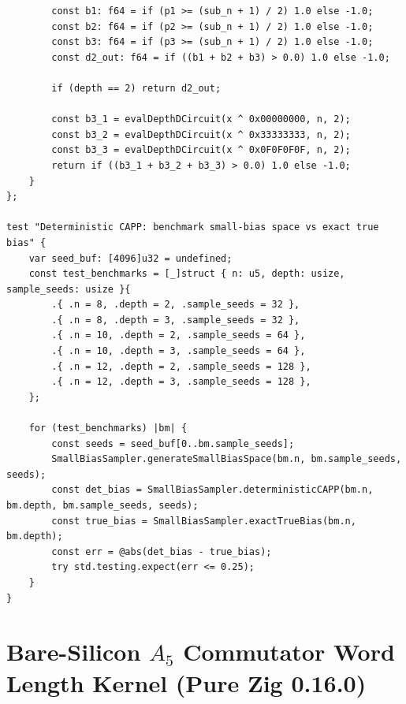 \documentclass[11pt,a4paper]{article}
\theoremstyle{definition}
\theoremstyle{remark}
\begin{document}
\begin{lstlisting}
        const b1: f64 = if (p1 >= (sub_n + 1) / 2) 1.0 else -1.0;
        const b2: f64 = if (p2 >= (sub_n + 1) / 2) 1.0 else -1.0;
        const b3: f64 = if (p3 >= (sub_n + 1) / 2) 1.0 else -1.0;
        const d2_out: f64 = if ((b1 + b2 + b3) > 0.0) 1.0 else -1.0;

        if (depth == 2) return d2_out;

        const b3_1 = evalDepthDCircuit(x ^ 0x00000000, n, 2);
        const b3_2 = evalDepthDCircuit(x ^ 0x33333333, n, 2);
        const b3_3 = evalDepthDCircuit(x ^ 0x0F0F0F0F, n, 2);
        return if ((b3_1 + b3_2 + b3_3) > 0.0) 1.0 else -1.0;
    }
};

test "Deterministic CAPP: benchmark small-bias space vs exact true bias" {
    var seed_buf: [4096]u32 = undefined;
    const test_benchmarks = [_]struct { n: u5, depth: usize, sample_seeds: usize }{
        .{ .n = 8, .depth = 2, .sample_seeds = 32 },
        .{ .n = 8, .depth = 3, .sample_seeds = 32 },
        .{ .n = 10, .depth = 2, .sample_seeds = 64 },
        .{ .n = 10, .depth = 3, .sample_seeds = 64 },
        .{ .n = 12, .depth = 2, .sample_seeds = 128 },
        .{ .n = 12, .depth = 3, .sample_seeds = 128 },
    };

    for (test_benchmarks) |bm| {
        const seeds = seed_buf[0..bm.sample_seeds];
        SmallBiasSampler.generateSmallBiasSpace(bm.n, bm.sample_seeds, seeds);
        const det_bias = SmallBiasSampler.deterministicCAPP(bm.n, bm.depth, bm.sample_seeds, seeds);
        const true_bias = SmallBiasSampler.exactTrueBias(bm.n, bm.depth);
        const err = @abs(det_bias - true_bias);
        try std.testing.expect(err <= 0.25);
    }
}
\end{lstlisting}

\section{Bare-Silicon $A_5$ Commutator Word Length Kernel (Pure Zig 0.16.0)}\label{app:a5_kernel}
\end{document}
